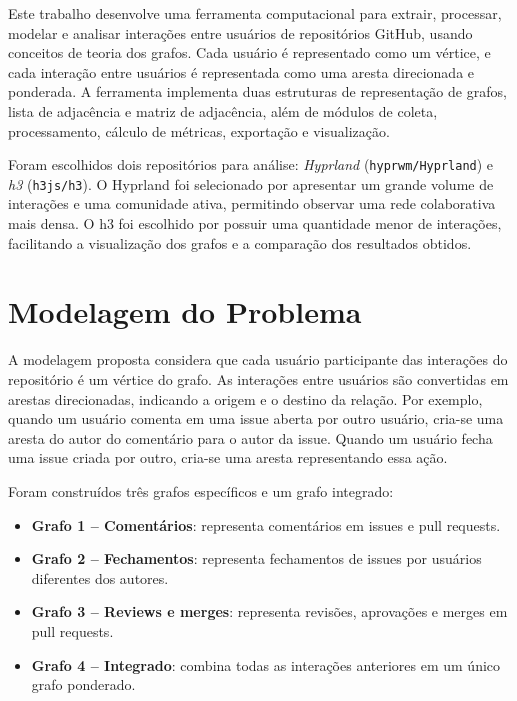 \documentclass[12pt]{article}
\begin{document}
Este trabalho desenvolve uma ferramenta computacional para extrair, processar,
modelar e analisar interações entre usuários de repositórios GitHub, usando
conceitos de teoria dos grafos. Cada usuário é representado como um vértice, e
cada interação entre usuários é representada como uma aresta direcionada e
ponderada. A ferramenta implementa duas estruturas de representação de grafos,
lista de adjacência e matriz de adjacência, além de módulos de coleta,
processamento, cálculo de métricas, exportação e visualização.

Foram escolhidos dois repositórios para análise: \textit{Hyprland}
(\texttt{hyprwm/Hyprland}) e \textit{h3} (\texttt{h3js/h3}). O Hyprland foi
selecionado por apresentar um grande volume de interações e uma comunidade ativa,
permitindo observar uma rede colaborativa mais densa. O h3 foi escolhido por
possuir uma quantidade menor de interações, facilitando a visualização dos
grafos e a comparação dos resultados obtidos.

\section{Modelagem do Problema}

A modelagem proposta considera que cada usuário participante das interações do
repositório é um vértice do grafo. As interações entre usuários são convertidas
em arestas direcionadas, indicando a origem e o destino da relação. Por exemplo,
quando um usuário comenta em uma issue aberta por outro usuário, cria-se uma
aresta do autor do comentário para o autor da issue. Quando um usuário fecha uma
issue criada por outro, cria-se uma aresta representando essa ação.

Foram construídos três grafos específicos e um grafo integrado:

\begin{itemize}
    \item \textbf{Grafo 1 -- Comentários}: representa comentários em issues e
    pull requests.
    \item \textbf{Grafo 2 -- Fechamentos}: representa fechamentos de issues por
    usuários diferentes dos autores.
    \item \textbf{Grafo 3 -- Reviews e merges}: representa revisões, aprovações
    e merges em pull requests.
    \item \textbf{Grafo 4 -- Integrado}: combina todas as interações anteriores
    em um único grafo ponderado.
\end{itemize}
\end{document}
